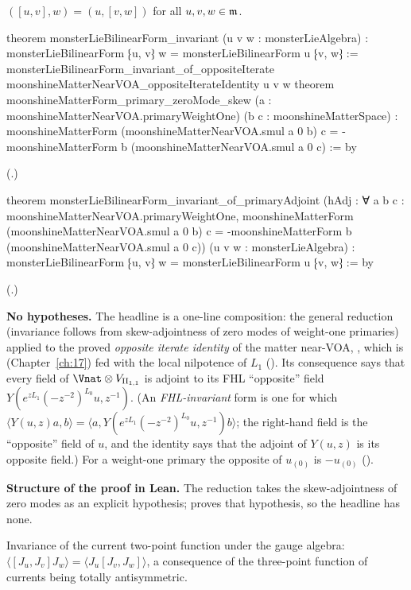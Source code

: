 \begin{theorem}\label{ch18:thm:invariance}
$([u,v],w)=(u,[v,w])$ for all $u,v,w\in\mathfrak{m}$.
\end{theorem}
\begin{leancode}
theorem monsterLieBilinearForm_invariant (u v w : monsterLieAlgebra) :
    monsterLieBilinearForm ⁅u, v⁆ w = monsterLieBilinearForm u ⁅v, w⁆ :=
  monsterLieBilinearForm_invariant_of_oppositeIterate
    moonshineMatterNearVOA_oppositeIterateIdentity u v w
theorem moonshineMatterForm_primary_zeroMode_skew
    (a : moonshineMatterNearVOA.primaryWeightOne) (b c : moonshineMatterSpace) :
    moonshineMatterForm (moonshineMatterNearVOA.smul a 0 b) c =
      -moonshineMatterForm b (moonshineMatterNearVOA.smul a 0 c) := by
\end{leancode}
(.)
\begin{leancode}
theorem monsterLieBilinearForm_invariant_of_primaryAdjoint
    (hAdj : ∀ a b c : moonshineMatterNearVOA.primaryWeightOne,
      moonshineMatterForm (moonshineMatterNearVOA.smul a 0 b) c =
        -moonshineMatterForm b (moonshineMatterNearVOA.smul a 0 c))
    (u v w : monsterLieAlgebra) :
    monsterLieBilinearForm ⁅u, v⁆ w = monsterLieBilinearForm u ⁅v, w⁆ := by
\end{leancode}
(.)
\begin{dictionary}
\textbf{No hypotheses.}  The headline is a one-line composition: the general reduction (invariance follows
from skew-adjointness of zero modes of weight-one primaries) applied to the proved \emph{opposite iterate
identity} of the matter near-VOA, , which is
 (Chapter~\ref{ch:17}) fed with the local nilpotence of
$L_1$ ().  Its consequence
 says that every field of $\Vnat\otimes V_{\chXVIIIII}$ is adjoint to its FHL
``opposite'' field $Y(e^{zL_1}(-z^{-2})^{L_0}u,z^{-1})$.  (An \emph{FHL-invariant} form is one for which $\langle Y(u,z)a,b\rangle=
\langle a,Y(e^{zL_1}(-z^{-2})^{L_0}u,z^{-1})b\rangle$; the right-hand field is the ``opposite'' field of $u$, and the identity says that
the adjoint of $Y(u,z)$ is its opposite field.)  For a weight-one primary the opposite of $u_{(0)}$ is $-u_{(0)}$
().

\textbf{Structure of the proof in Lean.}  The reduction  takes the
skew-adjointness of zero modes as an explicit hypothesis;  proves that hypothesis,
so the headline has none.
\end{dictionary}
\begin{physics}
Invariance of the current two-point function under the gauge algebra: $\langle[J_u,J_v]J_w\rangle=\langle J_u[J_v,J_w]\rangle$, a
consequence of the three-point function of currents being totally antisymmetric.
\end{physics}
